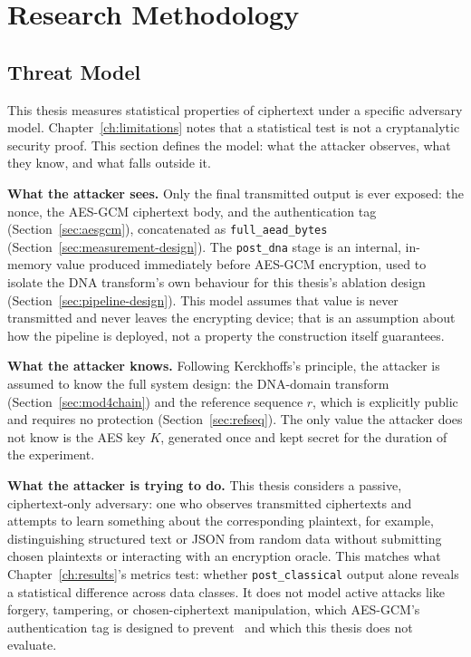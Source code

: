 \documentclass[12pt,a4paper,twoside]{report}
\numberwithin{equation}{chapter}
\begin{document}
\chapter{Research Methodology}
\label{ch:methodology}

\section{Threat Model}
\label{sec:threat-model}

This thesis measures statistical properties of ciphertext under a
specific adversary model. Chapter~\ref{ch:limitations}
notes that a statistical test is not a cryptanalytic security
proof. This section defines the model: what the attacker observes,
what they know, and what falls outside it.

\textbf{What the attacker sees.} Only the final transmitted output is
ever exposed: the nonce, the AES-GCM ciphertext body, and the
authentication tag (Section~\ref{sec:aesgcm}), concatenated as
\texttt{full\_aead\_bytes} (Section~\ref{sec:measurement-design}). The
\texttt{post\_dna} stage is an internal, in-memory value produced
immediately before AES-GCM encryption, used to isolate the DNA
transform's own behaviour for this thesis's ablation design
(Section~\ref{sec:pipeline-design}). This model assumes that value is
never transmitted and never leaves the encrypting device; that is an
assumption about how the pipeline is deployed, not a property the
construction itself guarantees.

\textbf{What the attacker knows.} Following Kerckhoffs's principle,
the attacker is assumed to know the full system design: the
DNA-domain transform (Section~\ref{sec:mod4chain}) and the reference
sequence $r$, which is explicitly public and requires no protection
(Section~\ref{sec:refseq}). The only value the attacker does not know
is the AES key $K$, generated once and kept secret for the duration
of the experiment.

\textbf{What the attacker is trying to do.} This thesis considers a
passive, ciphertext-only adversary: one who observes transmitted
ciphertexts and attempts to learn something about the corresponding
plaintext, for example, distinguishing structured text or JSON
from random data without submitting chosen plaintexts or
interacting with an encryption oracle. This matches what
Chapter~\ref{ch:results}'s metrics test: whether \texttt{post\_classical}
output alone reveals a statistical difference across data classes. It
does not model active attacks like forgery, tampering, or
chosen-ciphertext manipulation, which AES-GCM's authentication tag is designed to
prevent~\cite{nist80038d} and which this thesis does not evaluate.
\end{document}
